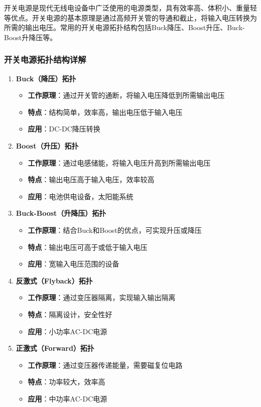 \documentclass[12pt,UTF8]{ctexbook}
\begin{document}
开关电源是现代无线电设备中广泛使用的电源类型，具有效率高、体积小、重量轻等优点。开关电源的基本原理是通过高频开关管的导通和截止，将输入电压转换为所需的输出电压。常用的开关电源拓扑结构包括Buck降压、Boost升压、Buck-Boost升降压等。

\subsubsection{开关电源拓扑结构详解}

\begin{enumerate}
    \item \textbf{Buck（降压）拓扑}
    \begin{itemize}
        \item \textbf{工作原理}：通过开关管的通断，将输入电压降低到所需输出电压
        \item \textbf{特点}：结构简单，效率高，输出电压低于输入电压
        \item \textbf{应用}：DC-DC降压转换
    \end{itemize}
    
    \item \textbf{Boost（升压）拓扑}
    \begin{itemize}
        \item \textbf{工作原理}：通过电感储能，将输入电压升高到所需输出电压
        \item \textbf{特点}：输出电压高于输入电压，效率较高
        \item \textbf{应用}：电池供电设备，太阳能系统
    \end{itemize}
    
    \item \textbf{Buck-Boost（升降压）拓扑}
    \begin{itemize}
        \item \textbf{工作原理}：结合Buck和Boost的优点，可实现升压或降压
        \item \textbf{特点}：输出电压可高于或低于输入电压
        \item \textbf{应用}：宽输入电压范围的设备
    \end{itemize}
    
    \item \textbf{反激式（Flyback）拓扑}
    \begin{itemize}
        \item \textbf{工作原理}：通过变压器隔离，实现输入输出隔离
        \item \textbf{特点}：隔离设计，安全性好
        \item \textbf{应用}：小功率AC-DC电源
    \end{itemize}
    
    \item \textbf{正激式（Forward）拓扑}
    \begin{itemize}
        \item \textbf{工作原理}：通过变压器传递能量，需要磁复位电路
        \item \textbf{特点}：功率较大，效率高
        \item \textbf{应用}：中功率AC-DC电源
    \end{itemize}
\end{enumerate}
\end{document}
